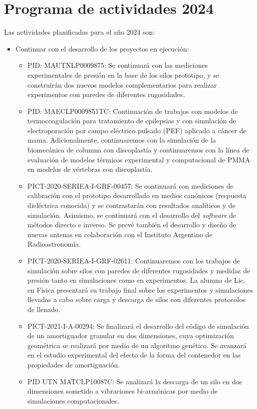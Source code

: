 \documentclass[a4paper,11pt,twoside,final,titlepage,onecolumn,openright]{report}
\begin{document}
\chapter{Programa de actividades 2024}

Las actividades planificadas para el año 2024 son:

\begin{itemize}
\item Continuar con el desarrollo de los proyectos en ejecución:
    \begin{itemize}
\item PID: MAUTNLP0009875: Se continuará con las mediciones experimentales de presión en la base de los silos prototipo, y se construirán dos nuevos modelos complementarios para realizar experimentos con paredes de diferentes rugosidades. 
 \item PID: MAECLP0009851TC: Continuación de trabajos con modelos de termocoagulación para tratamiento de epilepsias y con simulación de electroporación por campo eléctrico pulsado (PEF) aplicado a cáncer de mama. Adicionalmente, continuaremos con la simulación de la biomecánica de columna con discoplastía y continuaremos con la línea de evaluación  de modelos térmicos experimental y computacional de PMMA en modelos de vértebras con discoplastía.
\item PICT-2020-SERIEA-I-GRF-00457: Se continuará con mediciones de calibración con el prototipo desarrollado en medios canónicos (respuesta dieléctrica conocida) y se contrastarán con resultados analíticos y de simulación. Asimismo, se continuará con el desarrollo del \textit{software} de métodos directo e inverso. Se prevé también el desarrollo y diseño de nuevas antenas en colaboración con el Instituto Argentino de Radioastronomía.
\item PICT-2020-SERIEA-I-GRF-02611: Continuaremos con los trabajos de simulación sobre silos con paredes de diferentes rugosidades y medidas de presión tanto en simulaciones como en experimentos. La alumna de Lic. en Física presentará su trabajo final sobre los experimentos y simulaciones llevadas a cabo sobre carga y descarga de silos con diferentes protocolos de llenado.
\item PICT-2021-I-A-00294: Se finalizará el desarrollo del código de simulación de un amortiguador granular en dos dimensiones, cuya optimización geométrica se realizará por medio de un algoritmo genético. Se avanzará en el estudio experimental del efecto de la forma del contenedor en las propiedades de amortiguación.
\item PID UTN MATCLP10087C: Se analizará la descarga de un silo en dos dimensiones sometido a vibraciones bi-armónicas por medio de simulaciones computacionales.

\end{itemize}
\end{itemize}
\end{document}
